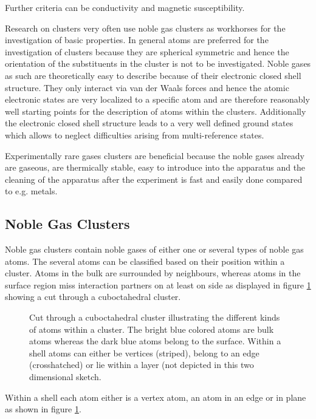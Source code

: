 Further criteria can be conductivity and magnetic susceptibility.

Research on clusters very often use noble gas clusters as workhorses for
the investigation of basic properties.
In general atoms are preferred for the investigation of clusters because
they are spherical symmetric and hence the orientation of the substituents
in the cluster is not to be investigated.
Noble gases as such are theoretically easy to describe because of their
electronic closed shell structure.
They only interact via
van der Waals forces and hence the atomic electronic states are very
localized to a specific atom and are therefore
reasonably well starting points for the description of atoms within the
clusters. 
Additionally the electronic closed shell structure leads to a very well
defined ground states which allows to neglect difficulties arising from
multi-reference states.

Experimentally rare gases clusters are beneficial because the noble gases
already are gaseous, are
thermically stable, easy to introduce into the apparatus
and the cleaning of the
apparatus after the experiment is fast and easily done compared to
e.g. metals.


\subsection{Noble Gas Clusters}
Noble gas clusters contain noble gases of either one or several types of
noble gas atoms. The several atoms can be classified based on
their position within a cluster. Atoms in the bulk are surrounded by
neighbours, whereas atoms in the surface region miss interaction
partners on at least on side as displayed in figure \ref{figure:cluster_cut} showing
a cut through a cuboctahedral cluster.

\begin{figure}[h]
 \centering
 
 \caption{Cut through a cuboctahedral cluster illustrating the different
          kinds of atoms within a cluster. The bright blue colored atoms
          are bulk atoms whereas the dark blue atoms belong to the surface.
          Within a shell atoms can either be vertices (striped), belong to
          an edge (crosshatched) or lie within a layer (not depicted in this
          two dimensional sketch.}
 \label{figure:cluster_cut}
\end{figure}

Within a shell each atom either is a vertex atom, an atom in an edge
or in plane as shown in figure \ref{figure:cluster_cut}.

